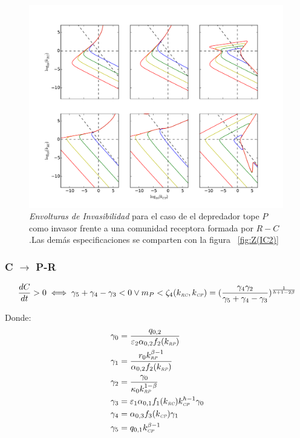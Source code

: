 \begin{figure}
  \centering
  \includegraphics[width = 0.99\textwidth]{./Plots/Z(IC4)AcGrGr.pdf}
  \caption[Env $Z(IC4)$]{\emph{Envolturas de Invasibilidad} para el caso de el depredador tope $P$ como invasor frente a una comunidad receptora formada por $R-C$ .Las dem\'as especificaciones se comparten con la figura ~\ref{fig:Z(IC2)}}
  \label{fig:Z(IC4)}
\end{figure}


\subsubsection{C $\to$ P-R}
\begin{equation}
  \frac{dC}{dt}  >0 \iff \gamma_5 + \gamma_4 - \gamma_3 < 0 \lor  m_P < \zeta_4(k_{\textit{\tiny RC}},k_{\textit{\tiny CP}}) = (\frac{\gamma_4\gamma_2}{\gamma_5 + \gamma_4 - \gamma_3})^{\frac{1}{h + 1 - 2\beta}}
\end{equation}

Donde:
\begin{equation}
  \begin{aligned}
    \gamma_0 &= \frac{q_{0,2}}{\varepsilon_2 \alpha_{0,2} f_2(k_{\textit{\tiny RP}})}\\
    \gamma_1 &= \frac{r_0 k_{\textit{\tiny RP}}^{\beta -1}}{\alpha_{0,2} f_2(k_{\textit{\tiny RP}})}\\
    \gamma_2 &= \frac{\gamma_0}{\kappa_0 k_{\textit{\tiny RP}}^{1-\beta}} \\
    \gamma_3 &= \varepsilon_1\alpha_{0,1} f_1(k_{\textit{\tiny RC}}) k_{\textit{\tiny CP}}^{h -1} \gamma_0\\
    \gamma_4 &=\alpha_{0,3} f_3(k_{\textit{\tiny CP}}) \gamma_1 \\
    \gamma_5 &= q_{0,1} k_{\textit{\tiny CP}}^{\beta-1}
  \end{aligned}
\end{equation}

